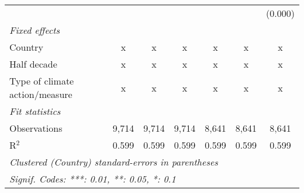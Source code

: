 \begin{tabular}{lcccccc}
                                              &         &         &         &              &              & (0.000)\\   
   \emph{Fixed effects}\\
   Country                                    & x       & x       & x       & x            & x            & x\\  
   Half decade                                & x       & x       & x       & x            & x            & x\\  
   Type of climate action/measure             & x       & x       & x       & x            & x            & x\\  
   \midrule \emph{Fit statistics}\\
   Observations                               & 9,714   & 9,714   & 9,714   & 8,641        & 8,641        & 8,641\\  
   R$^2$                                      & 0.599   & 0.599   & 0.599   & 0.599        & 0.599        & 0.599\\  
   \midrule
   \multicolumn{7}{l}{\emph{Clustered (Country) standard-errors in parentheses}}\\
   \multicolumn{7}{l}{\emph{Signif. Codes: ***: 0.01, **: 0.05, *: 0.1}}\\
\end{tabular}
\par\endgroup


